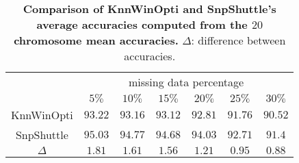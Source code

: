 \documentclass[a4paper,10pt]{article}
\begin{document}

\begin{table}[h]
        \begin{center}
                \begin{tabular}{|c|c|c|c|c|c|c|}
                        \hline & \multicolumn{6}{c|}{missing data percentage}\\
                                & $5\%$        & $10\%$ & $15\%$ & $20\%$ & $25\%$ & $30\%$\\
                        \hline
                                K{\sc nn}WinOpti & $93.22$ & $93.16$ & $93.12$ & $92.81$ & $91.76$ & $90.52$\\
                        \hline
                                S{\sc np}Shuttle & $95.03$ & $94.77$ & $94.68$ & $94.03$ & $92.71$ & $91.4$\\
                        \hline
                                $\Delta$ &$1.81$ & $1.61$ & $1.56$ & $1.21$ & $0.95$ & $0.88$\\
                        \hline
                \end{tabular}\\
        \end{center}
        \vspace{-3mm}
        \caption{{\bf Comparison of K{\sc nn}WinOpti and S{\sc np}Shuttle's average
accuracies computed from the $20$ chromosome mean accuracies.} $\Delta$: difference
between accuracies.}
        \label{tab:accuracies}
\end{table}

\end{document}
